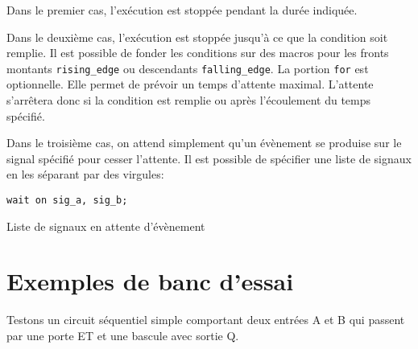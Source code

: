 \documentclass[letter, oneside]{book}
\begin{document}
\begin{enumerate}
Dans le premier cas, l'exécution est stoppée pendant la durée
indiquée.

Dans le deuxième cas, l'exécution est stoppée jusqu'à ce que la
condition soit remplie. Il est possible de fonder les conditions sur
des macros pour les fronts montants \texttt{rising\_edge} ou descendants
\texttt{falling\_edge}. La portion \texttt{for} est optionnelle. Elle permet de
prévoir un temps d'attente maximal. L'attente s'arrêtera donc si la
condition est remplie ou après l'écoulement du temps spécifié.

Dans le troisième cas, on attend simplement qu'un évènement se
produise sur le signal spécifié pour cesser l'attente. Il est possible
de spécifier une liste de signaux en les séparant par des virgules:

\begin{listing}[htbp]
\begin{verbatim}
wait on sig_a, sig_b;
\end{verbatim}
\caption{Liste de signaux en attente d'évènement}
\end{listing}
\end{enumerate}


\section{Exemples de banc d'essai}
\label{sec:org20cdfee}

Testons un circuit séquentiel simple comportant deux entrées A et
B qui passent par une porte ET et une bascule avec sortie Q.
\end{document}
